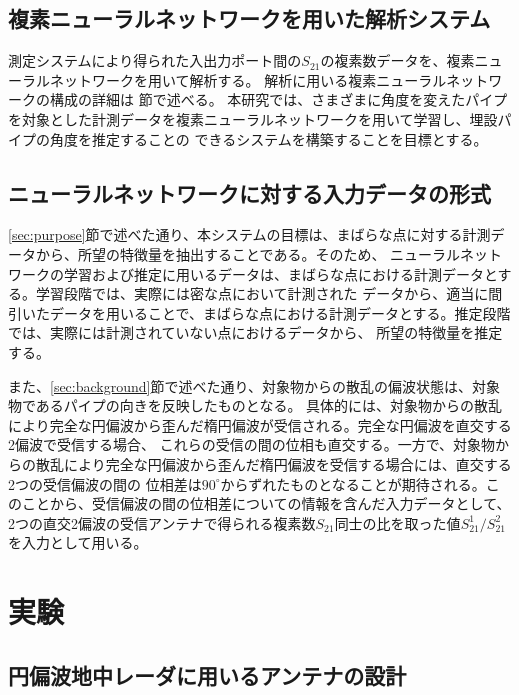 \documentclass[11pt,a4paper,uplatex]{ujarticle}
\begin{document}
  \subsection{複素ニューラルネットワークを用いた解析システム}

    測定システムにより得られた入出力ポート間の$S_{21}$の複素数データを、複素ニューラルネットワークを用いて解析する。
    解析に用いる複素ニューラルネットワークの構成の詳細は \label{sec:analysis} 節で述べる。
    本研究では、さまざまに角度を変えたパイプを対象とした計測データを複素ニューラルネットワークを用いて学習し、埋設パイプの角度を推定することの
    できるシステムを構築することを目標とする。

  \subsection{ニューラルネットワークに対する入力データの形式}

    \ref{sec:purpose}節で述べた通り、本システムの目標は、まばらな点に対する計測データから、所望の特徴量を抽出することである。そのため、
    ニューラルネットワークの学習および推定に用いるデータは、まばらな点における計測データとする。学習段階では、実際には密な点において計測された
    データから、適当に間引いたデータを用いることで、まばらな点における計測データとする。推定段階では、実際には計測されていない点におけるデータから、
    所望の特徴量を推定する。

    また、\ref{sec:background}節で述べた通り、対象物からの散乱の偏波状態は、対象物であるパイプの向きを反映したものとなる。
    具体的には、対象物からの散乱により完全な円偏波から歪んだ楕円偏波が受信される。完全な円偏波を直交する2偏波で受信する場合、
    これらの受信の間の位相も直交する。一方で、対象物からの散乱により完全な円偏波から歪んだ楕円偏波を受信する場合には、直交する2つの受信偏波の間の
    位相差は$90^\circ$からずれたものとなることが期待される。このことから、受信偏波の間の位相差についての情報を含んだ入力データとして、
    2つの直交2偏波の受信アンテナで得られる複素数$S_{21}$同士の比を取った値$S_{21}^1/S_{21}^2$を入力として用いる。


\section{実験}

  \subsection{円偏波地中レーダに用いるアンテナの設計}
\end{document}
